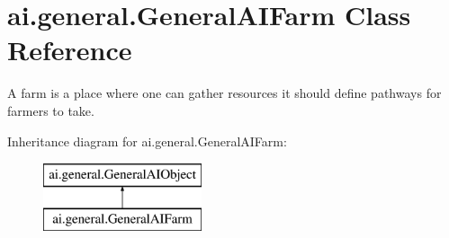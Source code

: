 \hypertarget{classai_1_1general_1_1_general_a_i_farm}{
\section{ai.general.GeneralAIFarm Class Reference}
\label{classai_1_1general_1_1_general_a_i_farm}
}


A farm is a place where one can gather resources it should define pathways for farmers to take.  


Inheritance diagram for ai.general.GeneralAIFarm:\begin{figure}[H]
\begin{center}
\leavevmode
\includegraphics[height=2.000000cm]{classai_1_1general_1_1_general_a_i_farm}
\end{center}
\end{figure}
